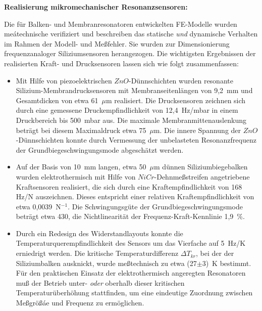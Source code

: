{\bf Realisierung mikromechanischer Resonanzsensoren:}

Die für Balken- und Membranresonatoren entwickelten FE-Modelle wurden
meátechnische verifiziert und beschreiben das statische {\em und}
dynamische Verhalten im Rahmen der Modell- und Meßfehler. Sie wurden zur
Dimensionierung frequenzanaloger Siliziumsensoren herangezogen. Die
wichtigsten Ergebnissen der realisierten Kraft- und Drucksensoren lassen
sich wie folgt zusammenfassen:
\begin{itemize}
\item
Mit Hilfe von piezoelektrischen $ZnO$-Dünnschichten wurden resonante
Silizium-Membrandrucksensoren mit Membranseitenlängen von 9,2~mm
und Gesamtdicken von etwa 61~$\mu$m realisiert. Die Drucksensoren
zeichnen sich durch eine gemessene Druckempfindlichkeit von 12,4~Hz/mbar
in einem Druckbereich bis 500~mbar aus. Die maximale Membranmittenauslenkung
beträgt bei diesem Maximaldruck etwa 75~$\mu$m. Die innere
Spannung der $ZnO$-Dünnschichten konnte durch Vermessung der unbelasteten
Resonanzfrequenz der Grundbiegeschwingungsmode abgeschätzt werden.
\item
Auf der Basis von 10~mm langen, etwa 50~$\mu$m dünnen Siliziumbiegebalken
wurden elektrothermisch mit Hilfe von $NiCr$-Dehnmeßstreifen
angetriebene Kraftsensoren realisiert, die sich durch eine
Kraftempfindlichkeit von 168 Hz/N auszeichnen. Dieses entspricht einer
relativen Kraftempfindlichkeit von etwa 0,0039~N$^{-1}$. Die
Schwingungsgüte der Grundbiegeschwingungsmode beträgt etwa 430,
die Nichtlinearität der Frequenz-Kraft-Kennlinie 1,9~\%.
\item
Durch ein Redesign des Widerstandlayouts konnte die
Temperaturquerempfindlichkeit des Sensors um das Vierfache auf
5~Hz/K erniedrigt werden. Die kritische
Temperaturdifferenz $\Delta T_{kr}$, bei der der Siliziumbalken ausknickt,
wurde meßtechnisch zu etwa (27$\pm3$)~K bestimmt.
Für den praktischen Einsatz der elektrothermisch angeregten Resonatoren
muß der Betrieb unter- {\em oder} oberhalb dieser kritischen
Temperaturüberhöhung stattfinden, um eine eindeutige
Zuordnung zwischen Meßgrößáe und Frequenz zu ermöglichen.
\end{itemize}
